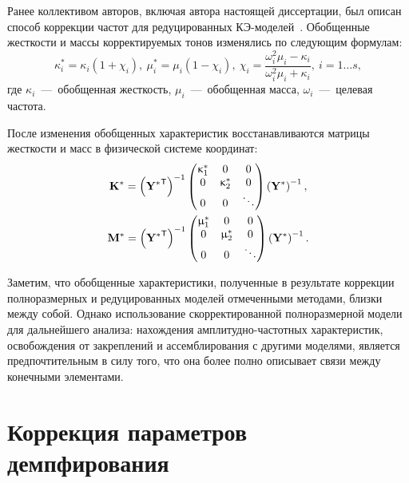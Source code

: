 Ранее коллективом авторов, включая автора настоящей диссертации, был описан способ коррекции частот для редуцированных КЭ-моделей~\cite{lib:author:spacecraft:cms}. Обобщенные жесткости и массы корректируемых тонов изменялись по следующим формулам:
\begin{equation}
	\kappa_i ^ * = \kappa_i (1 + \chi_i), \ \mu_i ^ * = \mu_i (1 - \chi_i), \ \chi_i = \frac{\omega_i ^ 2 \mu_i - \kappa_i}{\omega_i ^ 2 \mu_i + \kappa_i}, \ i = 1 \hdots s, \label{eq:reducedGenParametersUpdating}
\end{equation}
где $ \kappa_i $~---~обобщенная жесткость, $ \mu_i $~---~обобщенная масса, $ \omega_i $~---~целевая частота.

После изменения обобщенных характеристик восстанавливаются матрицы жесткости и масс в физической системе координат:
\begin{equation}
	\begin{gathered}
		\mathbf{K} ^ \ast = 
		\left( \mathbf{Y ^ \ast} ^ \mathsf{T} \right) ^ {-1} 
		\begin{pmatrix}
			\upkappa_1 ^ \ast & 0 & 0 \\
			0 & \upkappa_2 ^ \ast & 0 \\
			0 & 0 & \ddots
		\end{pmatrix} 
		\left( \mathbf{Y} ^ \ast \right) ^ {-1}, \\
		\mathbf{M} ^ \ast = 
		\left( \mathbf{Y ^ \ast} ^ \mathsf{T} \right) ^ {-1} 
		\begin{pmatrix}
			\upmu_1 ^ \ast & 0 & 0 \\
			0 & \upmu_2 ^ \ast & 0 \\
			0 & 0 & \ddots
		\end{pmatrix}
		\left( \mathbf{Y} ^ \ast \right) ^ {-1}.
	\end{gathered}
	\label{eq:reducedStructuralMatrices}
\end{equation}

Заметим, что обобщенные характеристики, полученные в результате коррекции полноразмерных и редуцированных моделей отмеченными методами, близки между собой. Однако использование скорректированной полноразмерной модели для дальнейшего анализа: нахождения амплитудно-частотных характеристик, освобождения от закреплений и ассемблирования с другими моделями, является предпочтительным в силу того, что она более полно описывает связи между конечными элементами.

\section{Коррекция параметров демпфирования}

